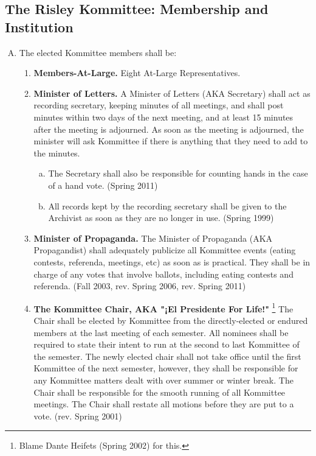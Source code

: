 \documentclass[12pt]{article}
\begin{document}
\begin{enumerate}[A.]
\section{The Risley Kommittee: Membership and Institution}
\begin{enumerate}[A.] 
\item The elected Kommittee members shall be:
\begin{enumerate}[1.]
\item \textbf{Members-At-Large.} Eight At-Large Representatives.
\item \textbf{Minister of Letters.} A Minister of Letters (AKA Secretary) shall act as recording secretary, keeping minutes of all meetings, and shall post minutes within two days of the next meeting, and at least 15 minutes after the meeting is adjourned. As soon as the meeting is adjourned, the minister will ask Kommittee if there is anything that they need to add to the minutes.
\begin{enumerate}[a.]
\item The Secretary shall also be responsible for counting hands in the case of a hand vote. (Spring 2011)
\item All records kept by the recording secretary shall be given to the Archivist as soon as they are no longer in use. (Spring 1999)
\end{enumerate}
\item \textbf{Minister of Propaganda.} The Minister of Propaganda (AKA Propagandist) shall adequately publicize all Kommittee events (eating contests, referenda, meetings, etc) as soon as is practical. They shall be in charge of any votes that involve ballots, including eating contests and referenda. (Fall 2003, rev. Spring 2006, rev. Spring 2011)
\item \textbf{The Kommittee Chair, AKA "¡El Presidente For Life!"} \footnote{Blame Dante Heifets (Spring 2002) for this.} The Chair shall be elected by Kommittee from the directly-elected or endured members at the last meeting of each semester. All nominees shall be required to state their intent to run at the second to last Kommittee of the semester. The newly elected chair shall not take office until the first Kommittee of the next semester, however, they shall be responsible for any Kommittee matters dealt with over summer or winter break. The Chair shall be responsible for the smooth running of all Kommittee meetings. The Chair shall restate all motions before they are put to a vote. (rev. Spring 2001)
\end{enumerate}

\end{enumerate}
\end{enumerate}
\end{document}
